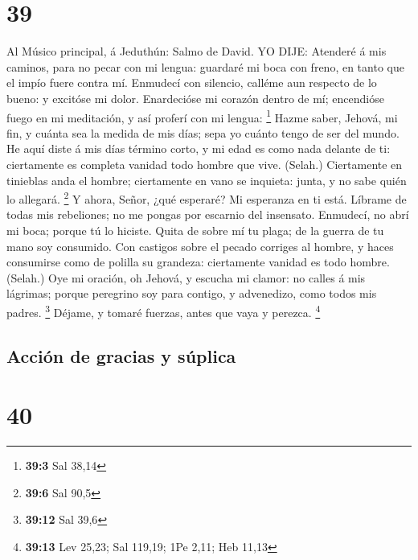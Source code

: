 \hypertarget{section-38}{%
\section{39}\label{section-38}}

 Al Músico principal, á Jeduthún: Salmo de David. YO DIJE:
Atenderé á mis caminos, para no pecar con mi lengua: guardaré mi boca
con freno, en tanto que el impío fuere contra mí.  Enmudecí
con silencio, calléme aun respecto de lo bueno: y excitóse mi dolor.
 Enardecióse mi corazón dentro de mí; encendióse fuego en mi
meditación, y así proferí con mi lengua: \footnote{\textbf{39:3} Sal
  38,14}  Hazme saber, Jehová, mi fin, y cuánta sea la
medida de mis días; sepa yo cuánto tengo de ser del mundo. 
He aquí diste á mis días término corto, y mi edad es como nada delante
de ti: ciertamente es completa vanidad todo hombre que vive. (Selah.)
 Ciertamente en tinieblas anda el hombre; ciertamente en
vano se inquieta: junta, y no sabe quién lo allegará. \footnote{\textbf{39:6}
  Sal 90,5}  Y ahora, Señor, ¿qué esperaré? Mi esperanza en
ti está.  Líbrame de todas mis rebeliones; no me pongas por
escarnio del insensato.  Enmudecí, no abrí mi boca; porque
tú lo hiciste.  Quita de sobre mí tu plaga; de la guerra de
tu mano soy consumido.  Con castigos sobre el pecado
corriges al hombre, y haces consumirse como de polilla su grandeza:
ciertamente vanidad es todo hombre. (Selah.)  Oye mi
oración, oh Jehová, y escucha mi clamor: no calles á mis lágrimas;
porque peregrino soy para contigo, y advenedizo, como todos mis padres.
\footnote{\textbf{39:12} Sal 39,6}  Déjame, y tomaré
fuerzas, antes que vaya y perezca. \footnote{\textbf{39:13} Lev 25,23;
  Sal 119,19; 1Pe 2,11; Heb 11,13}

\hypertarget{acciuxf3n-de-gracias-y-suxfaplica}{%
\subsection{Acción de gracias y
súplica}\label{acciuxf3n-de-gracias-y-suxfaplica}}

\hypertarget{section-39}{%
\section{40}\label{section-39}}

